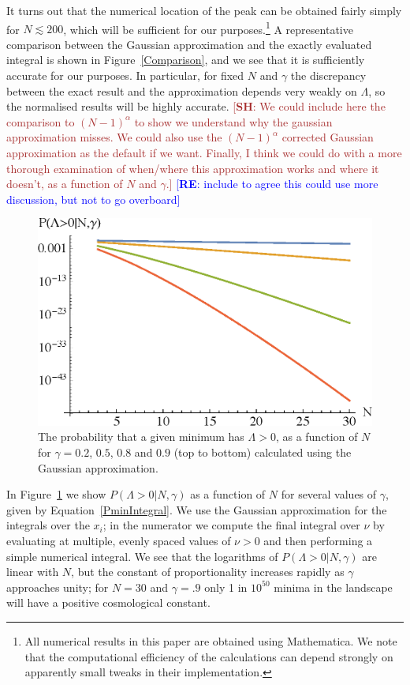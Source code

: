\documentclass[12pt]{article}
\newcommand{\re}[1]{\textcolor{blue}{[{\bf RE}: #1]}}
\newcommand{\SH}[1]{\textcolor{brown}{[{\bf SH}: #1]}}
\begin{document}
It turns out that the numerical location of the peak can be obtained fairly simply for $N\lesssim 200$, which will be sufficient for our purposes.\footnote{All numerical results in this paper are obtained using Mathematica. We note that the computational efficiency of the calculations can depend strongly on apparently small tweaks in their implementation.} A representative comparison between the Gaussian approximation and the exactly evaluated integral is shown in Figure~\ref{Comparison}, and we see that it is sufficiently accurate for our purposes. In particular, for fixed $N$ and $\gamma$ the discrepancy between the exact result and the approximation depends very weakly on $\Lambda$, so  the normalised results will be highly accurate.  
\SH{We could include here the comparison to $(N-1)^\alpha$ to show we understand why the gaussian approximation misses. We could also use the $(N-1)^\alpha$ corrected Gaussian approximation as the default if we want. Finally, I think we could do with a more thorough examination of when/where this approximation works and where it doesn't, as a function of $N$ and $\gamma$.} \re{include to agree  this could use more discussion, but not to go overboard} 

\begin{figure} 
  \centering
  \includegraphics[width=.6 \linewidth]{pwithN.eps}
  \caption{The probability that a given minimum has $\Lambda>0$, as a function of $N$ for $\gamma=0.2$, $0.5$, $0.8$ and $0.9$ (top to bottom) calculated using the Gaussian approximation. }
  \label{PVaryingWithNGaussian}
\end{figure}
  
In  Figure~\ref{PVaryingWithNGaussian} we show $P(\Lambda>0|N,\gamma)$ as a function of $N$ for several values of $\gamma$, given by Equation~\ref{PminIntegral}. We use the Gaussian approximation for the integrals over the $x_i$; in the numerator we compute the final integral over $\nu$ by evaluating at multiple, evenly spaced values of $\nu > 0$  and then performing a simple numerical integral. We see that the logarithms of $P(\Lambda>0|N,\gamma)$ are linear with $N$, but the constant of proportionality increases rapidly as $\gamma$ approaches unity; for $N=30$ and $\gamma = .9$ only 1 in $10^{50}$ minima in the landscape will have a positive cosmological constant. 
\end{document}
